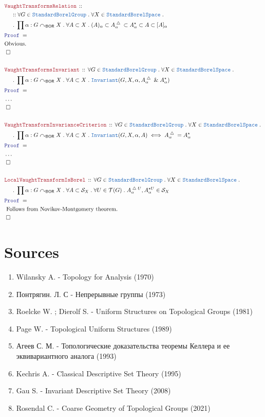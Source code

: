 \documentclass[12pt]{scrartcl}
\newcommand{\TYPE}[1]{\textcolor{NavyBlue}{\mathtt{#1}}}
\newcommand{\LOGIC}[1]{\textcolor{Blue}{\mathtt{#1}}}
\newcommand{\THM}[1]{\textcolor{Maroon}{\mathtt{#1}}}
\renewcommand{\.}{\; . \;}
\newcommand{\Theorem}[2]{& \THM{#1} \, :: \, #2 \\ & \Proof = \\ }
\newcommand{\NewLine}{\\ & \kern 1pc}
\newcommand{\Page}[1]{ \begin{align*} #1 \end{align*}   }
\newcommand{\NoProof}{ & \ldots \\ \EndProof}
\renewcommand{\And}{\; \& \;}
\newcommand{\du}{\; \triangle \;}
\newcommand{\Explain}[1]{& \text{#1.} \\}
\newcommand{\QED}{\; \square}
\newcommand{\EndProof}{& \QED \\}
\newcommand{\Proof}{\LOGIC{Proof} \; }
\newcommand{\T}{\mathcal{T}}
\newcommand{\SBS}{\TYPE{StandardBorelSpace}}
\newcommand{\BOR}{\mathsf{BOR}}
\renewcommand{\S}{\mathcal{S}}
\newcommand{\ActOn}{\curvearrowright}
\newcommand{\SBG}{\TYPE{StandardBorelGroup}}
\renewcommand{\S}{\mathcal{S}}
\begin{document}
\Page{
	\Theorem{VaughtTransformsRelation}
	{
		\NewLine ::
		\forall G \in \SBG \. 
		\forall X \in \SBS \. \NewLine \.
		\prod \alpha : G \ActOn_\BOR X \.
		\forall A \subset X \.
		(A)_\alpha \subset A^{\du}_\alpha \subset A^{\star}_\alpha \subset  A \subset [A]_\alpha
	}
	\Explain{Obvious}
	\EndProof
	\\
	\Theorem{VaughtTransformsInvariant}
	{
		\forall G \in \SBG \. 
		\forall X \in \SBS \. \NewLine \.
		\prod \alpha : G \ActOn_\BOR X \.
		\forall A \subset X \.
		\TYPE{Invariant}( G,X,\alpha, A^{\du}_\alpha \And A^{\star}_\alpha )
 	}
	\NoProof
	\\
	\Theorem{VaughtTransformInvarianceCriterion}
	{
		\forall G \in \SBG \. 
		\forall X \in \SBS \. \NewLine \.
		\prod \alpha : G \ActOn_\BOR X \.
		\forall A \subset X \.
		\TYPE{Invariant}( G,X,\alpha, A)
		\iff
		A^{\du}_\alpha = A^{\star}_\alpha
	}
	\NoProof
	\\
	\Theorem{LocalVaughtTransformIsBorel}
	{
		\forall G \in \SBG \. 
		\forall X \in \SBS \. \NewLine \.
		\prod \alpha : G \ActOn_\BOR X \.
		\forall A \subset \S_X \.
		\forall U \in \T(G)   \.
		A^{\du U}_\alpha, A^{\star U}_\alpha \in \S_X
	}
	\Explain{ Follows from Novikov-Montgomery theorem}
	\EndProof
}
\newpage
\section*{Sources}
\begin{enumerate}
\item Wilansky A. - Topology for Analysis (1970) 
\item Понтрягин. Л. С - Непрерывные группы (1973)
\item Roelcke W. ; Dierolf S. - Uniform Structures on Topological Groups (1981) 
\item Page W. - Topological Uniform Structures (1989) 
\item Агеев С. М. - Топологические доказательства теоремы Келлера 
и ее эквивариантного аналога (1993)
\item Kechris A. - Classical Descriptive Set Theory (1995) 
\item Gau S.  - Invariant Descriptive Set Theory (2008) 
\item Rosendal C. - Coarse Geometry of Topological Groups (2021)
\end{enumerate}
\end{document}
